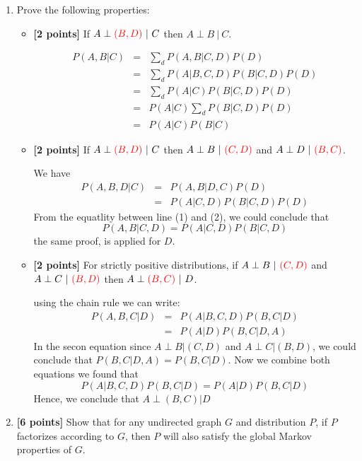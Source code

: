 \documentclass[12pt]{article} \usepackage[utf8]{inputenc}
\begin{document}
\begin{enumerate}
    \item Prove the following properties:
    \begin{itemize}
        \item \textbf{[2 points]} If $A \perp {\color{red} (B,D) } \ | \ C$ then $A \perp B \ | \ C$.
        \begin{solution}
          \small
         \begin{eqnarray*}
           P(A, B|C) &=& \sum_d P(A, B|C,D) P(D) \\
                     &=& \sum_d P(A|B,C,D) P(B|C,D) P(D)\\
                     &=& \sum_d P(A|C) P(B|C,D)P(D)\\
                     &=& P(A|C) \sum_d P(B|C,D)P(D)\\
                     &=& P(A|C) P(B|C)
         \end{eqnarray*} 
        \end{solution}
        \item \textbf{[2 points]} If $A \perp {\color{red} (B,D) } \ | \ C$ then $A \perp B \ | \ {\color{red} (C,D) }$ and $A \perp D \ | \ {\color{red} (B,C) }$.
      \begin{solution}
        We have
        \begin{eqnarray}
          P(A,B,D|C) &=&  P(A,B|D,C)P(D)\\
                     &=& P(A|C,D) P(B|C,D) P(D)
        \end{eqnarray}
        From the equatlity  between line (1) and (2), we could conclude
        that 
      \[
      P(A,B|C,D) = P(A|C,D) P(B|C,D)
      \]
      the same proof, is applied for $D$.
      \end{solution}
        \item \textbf{[2 points]} For strictly positive distributions, if $A \perp B \ | \ {\color{red} (C,D) }$ and $A \perp C \ | \ {\color{red} (B,D) }$ then $A \perp {\color{red} (B,C) } \ | \ D$.
          \begin{solution}
          using the chain rule we can write:
            \begin{eqnarray*}
              P(A,B,C|D) &=& P(A|B,C,D) P(B,C|D)\\
                         &=& P(A|D) P (B,C|D,A)
            \end{eqnarray*}
            In the secon equation since $A \perp B | (C,D)$ and $A \perp C|
            (B,D)$, we could conclude that $P(B,C|D,A) = P(B,C|D)$. Now we
            combine both equations we found that 
            \[
              P(A|B,C,D)P(B,C|D) = P(A|D)P(B,C|D)
            \]
            Hence, we conclude that $A\perp (B,C) | D$
          \end{solution}
    \end{itemize}
    \item \textbf{[6 points]} Show that for any undirected graph $G$ and distribution $P$, if $P$ factorizes according to $G$, then $P$ will also satisfy the global Markov properties of $G$.


\end{enumerate}
\end{document}
